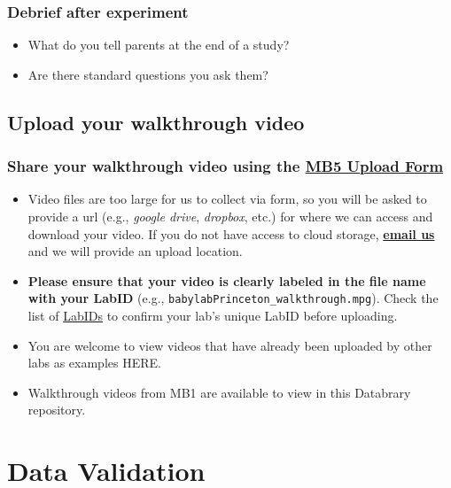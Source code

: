 \documentclass[
  letterpaper,
  DIV=11,
  numbers=noendperiod,
  oneside]{scrreprt}
\providecommand{\tightlist}{%
  \setlength{\itemsep}{0pt}\setlength{\parskip}{0pt}}
\begin{document}
\subsection{Debrief after experiment}\label{debrief-after-experiment}

\begin{itemize}
\tightlist
\item
  What do you tell parents at the end of a study?
\item
  Are there standard questions you ask them?
\end{itemize}

\section{Upload your walkthrough
video}\label{upload-your-walkthrough-video}

\subsection{\texorpdfstring{Share your walkthrough video using the
\href{https://airtable.com/appRoqMKzcK3NsXt4/pagPm3MXnFExsz1Ti/form}{MB5
Upload
Form}}{Share your walkthrough video using the MB5 Upload Form}}\label{share-your-walkthrough-video-using-the}

\begin{itemize}
\tightlist
\item
  Video files are too large for us to collect via form, so you will be
  asked to provide a url (e.g., \emph{google drive}, \emph{dropbox},
  etc.) for where we can access and download your video. If you do not
  have access to cloud storage,
  \href{mailto:mb5@manybabies.org}{\textbf{email us}} and we will
  provide an upload location.
\item
  \textbf{Please ensure that your video is clearly labeled in the file
  name with your LabID} (e.g.,
  \texttt{babylabPrinceton\_walkthrough.mpg}). Check the list of
  \href{https://manybabies.org/labids/}{LabIDs} to confirm your lab's
  unique LabID before uploading.
\item
  You are welcome to view videos that have already been uploaded by
  other labs as examples HERE.
\item
  Walkthrough videos from MB1 are available to view in this Databrary
  repository.
\end{itemize}

\chapter{Data Validation}\label{sec-validation}
\end{document}
